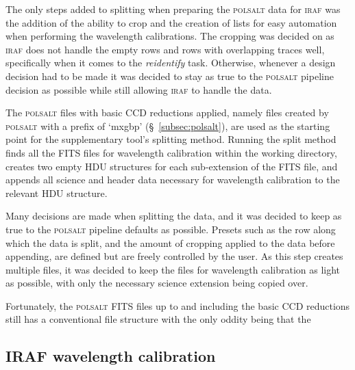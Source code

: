 The only steps added to splitting when preparing the \textsc{polsalt} data for \textsc{iraf} was the addition of the ability to crop and the creation of lists for easy automation when performing the wavelength calibrations. The cropping was decided on as \textsc{iraf} does not handle the empty rows and rows with overlapping traces well, specifically when it comes to the \textit{reidentify} task. Otherwise, whenever a design decision had to be made it was decided to stay as true to the \textsc{polsalt} pipeline decision as possible while still allowing \textsc{iraf} to handle the data.
\prgph

The \textsc{polsalt} files with basic \gls{CCD} reductions applied, namely files created by \textsc{polsalt} with a prefix of `mxgbp' (\S~\ref{subsec:polsalt}), are used as the starting point for the supplementary tool's splitting method. Running the split method finds all the \gls{FITS} files for wavelength calibration within the working directory, creates two empty \gls{HDU} structures for each sub-extension of the \gls{FITS} file, and appends all science and header data necessary for wavelength calibration to the relevant \gls{HDU} structure.

Many decisions are made when splitting the data, and it was decided to keep as true to the \textsc{polsalt} pipeline defaults as possible. Presets such as the row along which the data is split, and the amount of cropping applied to the data before appending, are defined but are freely controlled by the user. As this step creates multiple files, it was decided to keep the files for wavelength calibration as light as possible, with only the necessary science extension being copied over.

Fortunately, the \textsc{polsalt} \gls{FITS} files up to and including the basic \gls{CCD} reductions still has a conventional file structure with the only oddity being that the

\prgph




\subsection{IRAF wavelength calibration}\label{subsec:IRAF_wav_cal}

